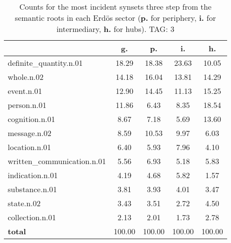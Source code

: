 \begin{table}[h!]
\begin{center}
\begin{tabular}{| l || c | c | c | c |}\hline
 & {\bf g.} & {\bf p.} & {\bf i.} & {\bf h.} \\\hline\hline
definite\_quantity.n.01 & 18.29  & 18.38  & 23.63  & 10.05 \\\hline
whole.n.02 & 14.18  & 16.04  & 13.81  & 14.29 \\\hline
event.n.01 & 12.90  & 14.45  & 11.13  & 15.25 \\\hline
person.n.01 & 11.86  & 6.43  & 8.35  & 18.54 \\\hline
cognition.n.01 & 8.67  & 7.18  & 5.69  & 13.60 \\\hline
message.n.02 & 8.59  & 10.53  & 9.97  & 6.03 \\\hline
location.n.01 & 6.40  & 5.93  & 7.96  & 4.10 \\\hline
written\_communication.n.01 & 5.56  & 6.93  & 5.18  & 5.83 \\\hline
indication.n.01 & 4.19  & 4.68  & 5.82  & 1.57 \\\hline
substance.n.01 & 3.81  & 3.93  & 4.01  & 3.47 \\\hline
state.n.02 & 3.43  & 3.51  & 2.72  & 4.50 \\\hline
collection.n.01 & 2.13  & 2.01  & 1.73  & 2.78 \\\hline\hline
{{\bf total}} & 100.00  & 100.00  & 100.00  & 100.00 \\\hline
\end{tabular}
\caption{Counts for the most incident synsets three step from the semantic roots in each Erd\"os sector ({\bf p.} for periphery, {\bf i.} for intermediary, {\bf h.} for hubs). TAG: 3}
\end{center}
\end{table}